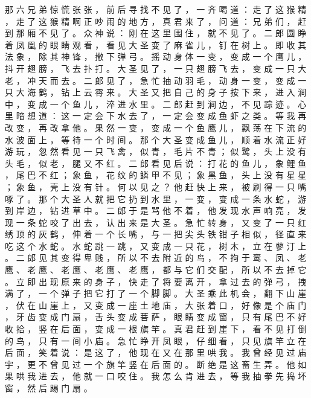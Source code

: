 {那 六 兄 弟 惊 慌 张 张 ， 前 后 寻 找 不 见 了 ， 一 齐 喝 道 ： 走 了 这 猴 精 ， 走 了 这 猴 精 啊 正 吵 闹 的 地 方 ， 真 君 来 了 ， 问 道 ： 兄 弟 们 ， 赶 到 那 厢 不 见 了 。 众 神 说 ： 刚 在 这 里 围 住 ， 就 不 见 了 。
二 郎 圆 睁 着 凤 凰 的 眼 睛 观 看 ， 看 见 大 圣 变 了 麻 雀 儿 ， 钉 在 树 上 。
即 收 其 法 象 ， 除 其 神 锋 ， 撤 下 弹 弓 。
摇 动 身 体 一 变 ， 变 成 一 个 鹰 儿 ， 抖 开 翅 膀 ， 飞 去 扑 打 。
大 圣 见 了 ， 一 只 翅 膀 飞 去 ， 变 成 一 只 大 老 ， 冲 天 而 去 。
二 郎 见 了 ， 急 忙 抽 动 羽 毛 ， 动 身 一 变 ， 变 成 一 只 大 海 鹤 ， 钻 上 云 霄 来 。
大 圣 又 把 自 己 的 身 子 按 下 来 ， 进 入 涧 中 ， 变 成 一 个 鱼 儿 ， 淬 进 水 里 。
二 郎 赶 到 涧 边 ， 不 见 踪 迹 。
心 里 暗 想 道 ： 这 一 定 会 下 水 去 了 ， 一 定 会 变 成 鱼 虾 之 类 。
等 我 再 改 变 ， 再 改 拿 他 。
果 然 一 变 ， 变 成 一 个 鱼 鹰 儿 ， 飘 荡 在 下 流 的 水 波 面 上 ， 等 待 一 个 时 间 。
那 个 大 圣 变 成 鱼 儿 ， 顺 着 水 流 正 好 游 玩 ， 忽 然 看 见 一 只 飞 禽 ， 似 青 ， 毛 片 不 青 ； 似 鹭 ， 头 上 没 有 头 毛 ， 似 老 ， 腿 又 不 红 。
二 郎 看 见 后 说 ： 打 花 的 鱼 儿 ， 象 鲤 鱼 ， 尾 巴 不 红 ； 象 鱼 ， 花 纹 的 鳞 甲 不 见 ； 象 黑 鱼 ， 头 上 没 有 星 星 ； 象 鱼 ， 壳 上 没 有 针 。
何 以 见 之 ？
他 赶 快 上 来 ， 被 刷 得 一 只 嘴 啄 了 。
那 个 大 圣 人 就 把 它 扔 到 水 里 ， 一 变 ， 变 成 一 条 水 蛇 ， 游 到 岸 边 ， 钻 进 草 中 。
二 郎 于 是 骂 他 不 着 ， 他 发 现 水 声 响 亮 ， 发 现 一 条 蛇 咬 了 出 去 ， 认 出 来 是 大 圣 。
急 忙 转 身 ， 又 变 了 一 只 红 绣 顶 的 灰 鹤 ， 伸 着 一 个 长 嘴 ， 与 一 把 尖 头 铁 钳 子 相 似 ， 径 直 来 吃 这 个 水 蛇 。
水 蛇 跳 一 跳 ， 又 变 成 一 只 花 ， 树 木 ， 立 在 蓼 汀 上 。
二 郎 见 其 变 得 卑 贱 ， 所 以 不 去 附 近 的 鸟 ， 不 拘 于 鸾 、 凤 、 老 鹰 、 老 鹰 、 老 鹰 、 老 鹰 、 老 鹰 ， 都 与 它 们 交 配 ， 所 以 不 去 掉 它 。
立 即 出 现 原 来 的 身 子 ， 快 走 了 将 要 离 开 ， 拿 过 去 的 弹 弓 ， 拽 满 了 ， 一 个 弹 子 把 它 打 了 一 个 脚 脚 。
大 圣 乘 此 机 会 ， 翻 下 山 崖 ， 伏 在 山 崖 上 ， 又 变 成 一 座 土 地 庙 ， 大 张 着 口 ， 好 像 是 个 庙 门 ， 牙 齿 变 成 门 扇 ， 舌 头 变 成 菩 萨 ， 眼 睛 变 成 窗 ， 只 有 尾 巴 不 好 收 拾 ， 竖 在 后 面 ， 变 成 一 根 旗 竿 。
真 君 赶 到 崖 下 ， 看 不 见 打 倒 的 鸟 ， 只 有 一 间 小 庙 。
急 忙 睁 开 凤 眼 ， 仔 细 看 ， 只 见 旗 竿 立 在 后 面 ， 笑 着 说 ： 是 这 了 ， 他 现 在 又 在 那 里 哄 我 。
我 曾 经 见 过 庙 宇 ， 更 不 曾 见 过 一 个 旗 竿 竖 在 后 面 的 。
断 绝 是 这 畜 生 弄 。
他 如 果 哄 我 进 去 ， 他 就 一 口 咬 住 。
我 怎 么 肯 进 去 ， 等 我 抽 拳 先 捣 坏 窗 ， 然 后 踢 门 扇 。
}
